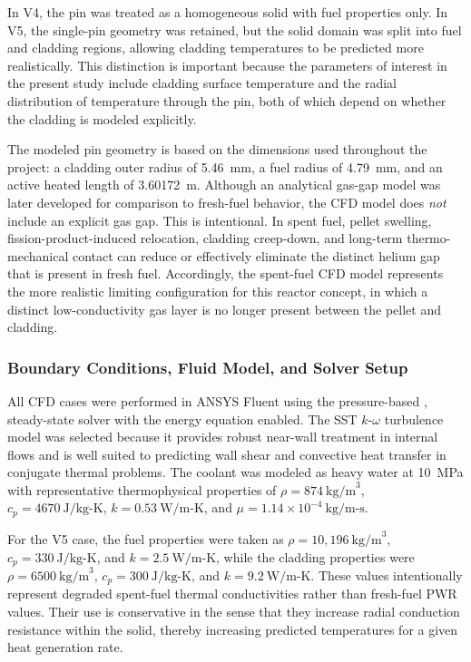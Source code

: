In V4, the pin was treated as a homogeneous solid with fuel properties only. In V5, the single-pin geometry was retained, but the solid domain was split into fuel and cladding regions, allowing cladding temperatures to be predicted more realistically. This distinction is important because the parameters of interest in the present study include cladding surface temperature and the radial distribution of temperature through the pin, both of which depend on whether the cladding is modeled explicitly.

The modeled pin geometry is based on the dimensions used throughout the project: a cladding outer radius of 5.46~mm, a fuel radius of 4.79~mm, and an active heated length of 3.60172~m. Although an analytical gas-gap model was later developed for comparison to fresh-fuel behavior, the CFD model does \emph{not} include an explicit gas gap. This is intentional. In spent fuel, pellet swelling, fission-product-induced relocation, cladding creep-down, and long-term thermo-mechanical contact can reduce or effectively eliminate the distinct helium gap that is present in fresh fuel. Accordingly, the spent-fuel CFD model represents the more realistic limiting configuration for this reactor concept, in which a distinct low-conductivity gas layer is no longer present between the pellet and cladding.

\subsubsection{Boundary Conditions, Fluid Model, and Solver Setup}

All CFD cases were performed in ANSYS Fluent using the pressure-based \cite{ANSYS_Fluent}, steady-state solver with the energy equation enabled. The SST \(k\)-\(\omega\) turbulence model was selected because it provides robust near-wall treatment in internal flows and is well suited to predicting wall shear and convective heat transfer in conjugate thermal problems. The coolant was modeled as heavy water at 10~MPa with representative thermophysical properties of \(\rho = 874\ \text{kg/m}^3\), \(c_p = 4670\ \text{J/kg-K}\), \(k = 0.53\ \text{W/m-K}\), and \(\mu = 1.14\times10^{-4}\ \text{kg/m-s}\).

For the V5 case, the fuel properties were taken as \(\rho = 10{,}196\ \text{kg/m}^3\), \(c_p = 330\ \text{J/kg-K}\), and \(k = 2.5\ \text{W/m-K}\), while the cladding properties were \(\rho = 6500\ \text{kg/m}^3\), \(c_p = 300\ \text{J/kg-K}\), and \(k = 9.2\ \text{W/m-K}\). These values intentionally represent degraded spent-fuel thermal conductivities rather than fresh-fuel PWR values. Their use is conservative in the sense that they increase radial conduction resistance within the solid, thereby increasing predicted temperatures for a given heat generation rate.

